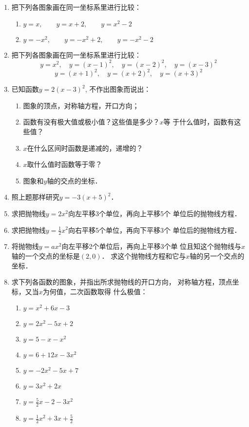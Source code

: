 \begin{enumerate}
    \item 把下列各图象画在同一坐标系里进行比较：
\begin{enumerate}
    \item $y=x,\qquad  y=x+2,\qquad  y=x^2-2$
    \item $y=-x^2,\qquad y=-x^2+2,\qquad y=-x^2-2$
\end{enumerate}

    \item 把下列各图象画在同一坐标系里进行比较：
  \[  y=x^2,\quad     y=(x-1)^2,\quad    y=(x-2)^2,\quad     y=(x-3)^2\]
 \[   y=(x+1)^2,\quad     y=(x+2)^2,\quad     y=(x+3)^2\]
    \item 已知函数$y=2(x-3)^2$, 不作出图象而说出：
\begin{enumerate}
\item 图象的顶点，对称轴方程，开口方向；
\item 函数有没有极大值或极小值？这些值是多少？$x$等
    于什么值时，函数有这些值？
    \item $x$在什么区间时函数是递减的，递增的？
    \item $x$取什么值时函数等于零？
    \item 图象和$y$轴的交点的坐标．
\end{enumerate}

    \item 照上题那样研究$y=-3(x+5)^2$．
    \item 求把抛物线$y=2x^2$向左平移3个单位，再向上平移5个
    单位后的抛物线方程．
    \item 求把抛物线$y=\frac{1}{2}x^2$向右平移5个单位，再向下平移3个
    单位后的抛物线方程．
    \item 将抛物线$y=ax^2$向左平移2个单位后，再向上平移3个单
    位且知这个抛物线与$x$轴的一个交点的坐标是$(2,0)$．
    求这个抛物线方程和它与$x$轴的另一个交点的坐标．
    \item 求下列各函数的图象，并指出所求抛物线的开口方向，
    对称轴方程，顶点坐标，又当$x$为何值，二次函数取得
    什么极值：
\begin{multicols}{2}
    \begin{enumerate}
        \item $y=x^2+6x-3$
        \item $y=2x^2-5x+2$
        \item $y=5-x-x^2$
        \item $y=6+12x-3x^2$
        \item $y=-2x^2-5x+7$
        \item $y=3x^2+2x$
        \item $y=\frac{5}{2}x-2-3x^2$
        \item $y=\frac{1}{2}x^2+3x+\frac{5}{2}$
    \end{enumerate}
\end{multicols}


\end{enumerate}
